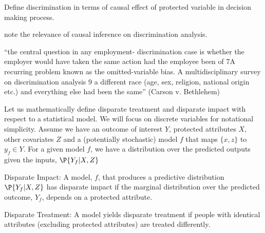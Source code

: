 
Define discrimination in terms of causal effect of protected variable in decision making process. 

\citep{Romei2012} note the relevance of causal inference on discrimination analysis.

“the central question in any employment- discrimination case is whether the employer would have taken the same action had the employee been of 7A recurring problem known as the omitted-variable bias.
A multidisciplinary survey on discrimination analysis 9
a different race (age, sex, religion, national origin etc.) and everything else had been the same” (Carson v. Bethlehem)


Let us mathematically define disparate treatment and disparate impact with respect to a statistical model. We will focus on discrete variables for notational simplicity. Assume we have an outcome of interest $Y$, protected attributes $X$, other covariates $Z$ and a (potentially stochastic) model $f$ that maps $\{x, z\}$ to $y_f \in Y$. For a given model $f$, we have a distribution over the predicted outputs given the inputs, $\P{Y_f|X,Z}$
\vspace{.2cm}
\begin{definition}{Disparate Impact}: A model, $f$, that produces a predictive distribution $\P{Y_f|X,Z}$ has disparate impact if the marginal distribution over the predicted outcome, $Y_f$, depends on a protected attribute.
\end{definition}

\begin{definition}{Disparate Treatment}: A model yields disparate treatment if people with identical attributes (excluding protected attributes) are treated differently. 
\end{definition}

